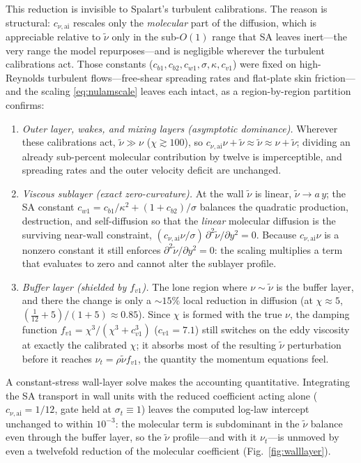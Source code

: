 \documentclass[journal]{new-aiaa}
\begin{document}
This reduction is invisible to Spalart's turbulent calibrations. The reason is structural: $c_{\nu,\mathrm{ai}}$ rescales
only the \emph{molecular} part of the diffusion, which is appreciable relative to
$\tilde\nu$ only in the sub-$O(1)$ range that SA leaves inert---the very range the
model repurposes---and is negligible wherever the turbulent calibrations act.
Those constants ($c_{b1},c_{b2},c_{w1},\sigma,\kappa,c_{v1}$) were fixed on
high-Reynolds turbulent flows---free-shear spreading rates and flat-plate skin
friction---and the scaling \eqref{eq:nulamscale} leaves each intact, as a
region-by-region partition confirms:
\begin{enumerate}
  \item \emph{Outer layer, wakes, and mixing layers (asymptotic dominance).}
  Wherever these calibrations act, $\tilde\nu\!\gg\!\nu$ ($\chi\!\gtrsim\!100$),
  so $c_{\nu,\mathrm{ai}}\nu+\tilde\nu\!\approx\!\tilde\nu\!\approx\!\nu+\tilde
  \nu$; dividing an already sub-percent molecular contribution by twelve is
  imperceptible, and spreading rates and the outer velocity deficit are
  unchanged.
  \item \emph{Viscous sublayer (exact zero-curvature).} At the wall $\tilde\nu$
  is linear, $\tilde\nu\!\to\!a\,y$; the SA constant
  $c_{w1}\!=\!c_{b1}/\kappa^2+(1+c_{b2})/\sigma$ balances the quadratic
  production, destruction, and self-diffusion so that the \emph{linear} molecular
  diffusion is the surviving near-wall constraint,
  $(c_{\nu,\mathrm{ai}}\nu/\sigma)\,\partial^2\tilde\nu/\partial y^2\!=\!0$.
  Because $c_{\nu,\mathrm{ai}}\nu$ is a nonzero constant it still enforces
  $\partial^2\tilde\nu/\partial y^2\!=\!0$: the scaling multiplies a term that
  evaluates to zero and cannot alter the sublayer profile.
  \item \emph{Buffer layer (shielded by $f_{v1}$).} The lone region where
  $\nu\!\sim\!\tilde\nu$ is the buffer layer, and there the change is only a
  $\sim\!15\%$ local reduction in diffusion (at $\chi\!\approx\!5$,
  $(\tfrac{1}{12}+5)/(1+5)\!\approx\!0.85$). Since $\chi$ is formed with the true
  $\nu$, the damping function $f_{v1}\!=\!\chi^3/(\chi^3+c_{v1}^3)$
  ($c_{v1}\!=\!7.1$) still switches on the eddy viscosity at exactly the
  calibrated $\chi$; it absorbs most of the resulting $\tilde\nu$ perturbation
  before it reaches $\nu_t\!=\!\rho\tilde\nu f_{v1}$, the quantity the momentum
  equations feel.
\end{enumerate}
A constant-stress wall-layer solve makes the accounting quantitative. Integrating
the SA transport in wall units with the reduced coefficient acting alone
($c_{\nu,\mathrm{ai}}\!=\!1/12$, gate held at $\sigma_t\!\equiv\!1$) leaves the
computed log-law intercept unchanged to within $10^{-3}$: the molecular term is
subdominant in the $\tilde\nu$ balance even through the buffer layer, so the
$\tilde\nu$ profile---and with it $\nu_t$---is unmoved by even a twelvefold
reduction of the molecular coefficient (Fig.~\ref{fig:walllayer}).
\end{document}
